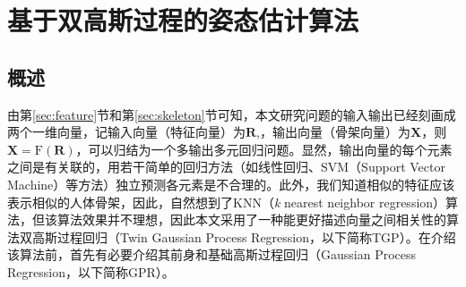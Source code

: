 

\chapter{基于双高斯过程的姿态估计算法}

\section{概述}
由第\ref{sec:feature}节和第\ref{sec:skeleton}节可知，本文研究问题的输入输出已经刻画成两个一维向量，记输入向量（特征向量）为$\mathbf{R}$,，输出向量（骨架向量）为$\mathbf{X}$，则$\mathbf{X}=\textrm{F}(\mathbf{R})$，可以归结为一个多输出多元回归问题。显然，输出向量的每个元素之间是有关联的，用若干简单的回归方法（如线性回归、SVM（Support Vector Machine）等方法）独立预测各元素是不合理的。此外，我们知道相似的特征应该表示相似的人体骨架，因此，自然想到了KNN（\emph{k} nearest neighbor regression）算法，但该算法效果并不理想，因此本文采用了一种能更好描述向量之间相关性的算法\pozhehao 双高斯过程回归（Twin Gaussian Process Regression，以下简称TGP）。在介绍该算法前，首先有必要介绍其前身和基础\pozhehao 高斯过程回归（Gaussian Process Regression，以下简称GPR）。

